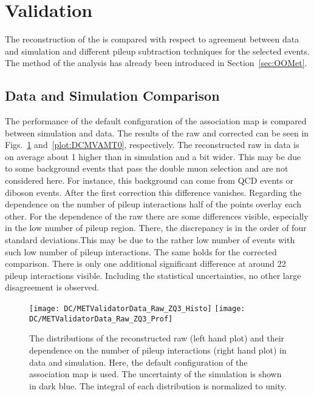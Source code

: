 \section{\texorpdfstring{\MET{}}{MET} Validation \label{sec:DCMV}}

The reconstruction of the \MET{} is compared with respect to agreement between data and simulation and different pileup subtraction techniques for the selected events. The method of the analysis has already been introduced in Section~\ref{sec:OOMet}. 

\subsection{Data and Simulation Comparison \label{sec:DCMVDSC}}
 
The performance of the default configuration of the association map is compared between simulation and data. The results of the raw and corrected \MET{} can be seen in Figs.~\ref{plot:DCMVAMRaw} and~\ref{plot:DCMVAMT0}, respectively. The reconstructed raw \MET{} in data is on average about 1\GeV{} higher than in simulation and a bit wider. This may be due to some background events that pass the double muon selection and are not considered here. For instance, this background can come from QCD events or diboson events. After the first correction this difference vanishes. Regarding the dependence on the number of pileup interactions half of the points overlay each other. For the dependence of the raw \MET{} there are some differences visible, especially in the low number of pileup region. There, the discrepancy is in the order of four standard deviations.This may be due to the rather low number of events with such  low number of pileup interactions. The same holds for the corrected \MET{} comparison. There is only one additional significant difference at around 22 pileup interactions visible. Including the statistical uncertainties, no other large disagreement is observed.

\begin{figure}[h!t]
  \centering
  \texttt{[image: DC/METValidatorData\_Raw\_ZQ3\_Histo]}
  \texttt{[image: DC/METValidatorData\_Raw\_ZQ3\_Prof]}
  \caption[Raw missing transverse energy distribution for the association map in data and simulation]{The distributions of the reconstructed raw \MET{} (left hand plot) and their dependence on the number of pileup interactions (right hand plot) in data and simulation. Here, the default configuration of the association map is used. The uncertainty of the simulation is shown in dark blue. The integral of each distribution is normalized to unity. \label{plot:DCMVAMRaw}}
\end{figure}

